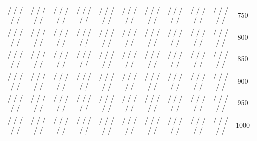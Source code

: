 \begin{appendices}
\begin{landscape}
\begin{tabular}{ccccccccccc}
        / / / / / & / / / / / & / / / / / & / / / / / & / / / / / & / / / / / & / / / / / & / / / / / & / / / / / & / / / / /  & 750 \\
         / / / / / & / / / / / & / / / / / & / / / / / & / / / / / & / / / / / & / / / / / & / / / / / & / / / / / & / / / / /  & 800 \\
     / / / / / & / / / / / & / / / / / & / / / / / & / / / / / & / / / / / & / / / / / & / / / / / & / / / / / & / / / / / & 850 \\
      / / / / / & / / / / / & / / / / / & / / / / / & / / / / / & / / / / / & / / / / / & / / / / / & / / / / / & / / / / /  & 900 \\
       / / / / / & / / / / / & / / / / / & / / / / / & / / / / / & / / / / / & / / / / / & / / / / / & / / / / / & / / / / / & 950 \\
        / / / / / & / / / / / & / / / / / & / / / / / & / / / / / & / / / / / & / / / / / & / / / / / & / / / / / & / / / / / & 1000 \\ \hline
  \end{tabular} 

\clearpage 
\end{landscape}


\end{appendices}
